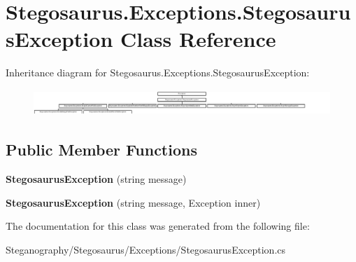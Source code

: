\hypertarget{class_stegosaurus_1_1_exceptions_1_1_stegosaurus_exception}{}\section{Stegosaurus.\+Exceptions.\+Stegosaurus\+Exception Class Reference}
\label{class_stegosaurus_1_1_exceptions_1_1_stegosaurus_exception}
Inheritance diagram for Stegosaurus.\+Exceptions.\+Stegosaurus\+Exception\+:\begin{figure}[H]
\begin{center}
\leavevmode
\includegraphics[height=0.985048cm]{class_stegosaurus_1_1_exceptions_1_1_stegosaurus_exception}
\end{center}
\end{figure}
\subsection*{Public Member Functions}
\begin{DoxyCompactItemize}
\item 
{\bfseries Stegosaurus\+Exception} (string message)\hypertarget{class_stegosaurus_1_1_exceptions_1_1_stegosaurus_exception_ab5364acb0e1e65fcd45458ee91f47ef9}{}\label{class_stegosaurus_1_1_exceptions_1_1_stegosaurus_exception_ab5364acb0e1e65fcd45458ee91f47ef9}

\item 
{\bfseries Stegosaurus\+Exception} (string message, Exception inner)\hypertarget{class_stegosaurus_1_1_exceptions_1_1_stegosaurus_exception_a8cccaf6c39b0b21a2fd12ce5c015991b}{}\label{class_stegosaurus_1_1_exceptions_1_1_stegosaurus_exception_a8cccaf6c39b0b21a2fd12ce5c015991b}

\end{DoxyCompactItemize}


The documentation for this class was generated from the following file\+:\begin{DoxyCompactItemize}
\item 
Steganography/\+Stegosaurus/\+Exceptions/Stegosaurus\+Exception.\+cs\end{DoxyCompactItemize}
